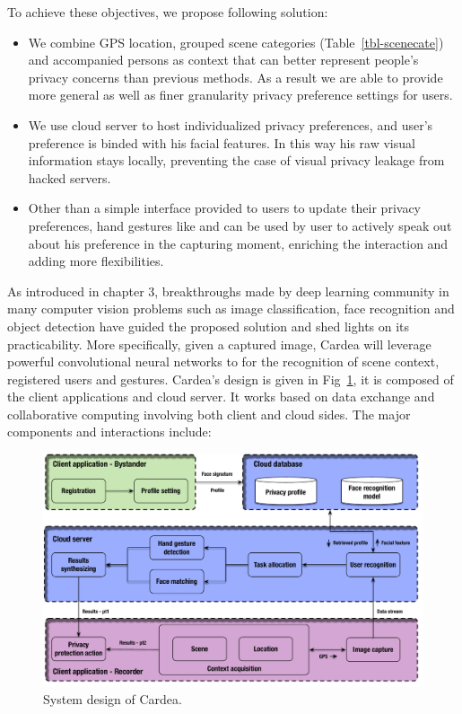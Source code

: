 To achieve these objectives, we propose following solution:
\begin{itemize}
  \item We combine GPS location, grouped scene categories (Table~\ref{tbl-scenecate}) and accompanied persons as context that can better represent people's privacy concerns than previous methods. As a result we are able to provide more general as well as finer granularity privacy preference settings for users.
\item We use cloud server to host individualized privacy preferences, and user's preference is binded with his facial features. In this way his raw visual information stays locally, preventing the case of visual privacy leakage from hacked servers.
\item Other than a simple interface provided to users to update their privacy preferences, hand gestures like  and  can be used by user to actively speak out about his preference in the capturing moment, enriching the interaction and adding more flexibilities.
\end{itemize}
As introduced in chapter 3, breakthroughs made by deep learning community in many computer vision problems such as image classification, face recognition and object detection have guided the proposed solution and shed lights on its practicability. More specifically, given a captured image, Cardea will leverage powerful convolutional neural networks to for the recognition of scene context, registered users and gestures. Cardea's design is given in Fig~\ref{fig:ch4-cardeadesign}, it is composed of the client applications and cloud server. It works based on data exchange and collaborative computing involving both client and cloud sides. The major components and interactions include:
\begin{figure}[!htbp]
    \centering
    \includegraphics[width=1.0\textwidth]{figure/ch4-cardeadesign.pdf}
    \caption{System design of Cardea.}
    \label{fig:ch4-cardeadesign}
\end{figure}


